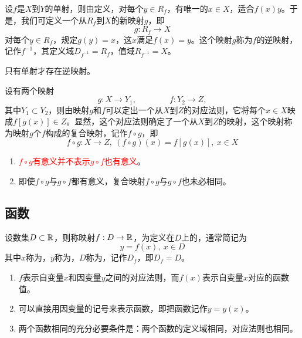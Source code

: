 \begin{definition}[逆映射]
	设\( f \)是\( X \)到\( Y \)的单射，则由定义，对每个\( y \in R_{f} \)，有唯一的\( x \in X \)，适合\( f(x) y \)。于是，我们可定义一个从\( R_{f} \)到\( X \)的新映射\( g \)，即
	\[ g: R_{f} \rightarrow X \]
	对每个\( y \in R_{f} \)，规定\( g(y) = x \)，这\( x \)满足\( f(x) = y \)。这个映射\( g \)称为\( f \)的逆映射，记作\( f^{-1} \)，其定义域\( D_{f^{-1}} = R_{f} \)，值域\( R_{f^{-1}} = X \)。
\end{definition}

\begin{note}
	只有单射才存在逆映射。
\end{note}

\begin{definition}[复合映射]
	设有两个映射
	\[ g:X \rightarrow Y_{1}, \qquad\qquad f:Y_{2} \rightarrow Z, \]
	其中\( Y_{1} \subset Y_{2} \)，则由映射\( g \)和\( f \)可以定出一个从\( X \)到\( Z \)的对应法则，它将每个\( x \in X \)映成\( f[g(x)] \in Z \)。显然，这个对应法则确定了一个从\( X \)到\( Z \)的映射，这个映射称为映射\( g \)个\( f \)构成的{\heiti 复合映射}，记作\( f \circ g \)，即
	\[ f \circ g: X \rightarrow Z,\ (f \circ g)(x) = f[g(x)],\ x \in X \]
\end{definition}

\begin{note}
	\begin{enumerate}
		\item \textcolor{red}{\( f \circ g \)有意义并不表示\( g \circ f \)也有意义}。
		\item \heiti 即使\( f \circ g \)与\( g \circ f \)都有意义，复合映射\( f \circ g \)与\( g \circ f \)也未必相同。
	\end{enumerate}
\end{note}

\subsection{函数}
\begin{definition}[函数的概念]
	设数集\( D \subset \mathbb{R} \)，则称映射\( f:D \rightarrow \mathbb{R} \)，为定义在\( D \)上的，通常简记为
	\[ y = f(x),\ x \in D \]
	其中\( x \)称为，\( y \)称为，\( D \)称为，记作\( D_{f} \)，即\( D_{f} = D \)。
\end{definition}

\begin{note}
	\begin{enumerate}
		\item \( f \)表示自变量\( x \)和因变量\( y \)之间的对应法则，而\( f(x) \)表示自变量\( x \)对应的函数值。
		\item 可以直接用因变量的记号来表示函数，即把函数记作\( y = y(x) \)。
		\item 两个函数相同的{\heiti 充分必要条件}是：两个函数的{\heiti 定义域}相同，{\heiti 对应法则}也相同。
	\end{enumerate}
\end{note}

